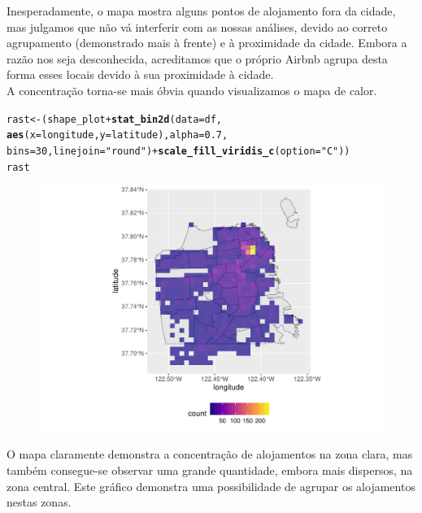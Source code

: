 \documentclass[justified, 11pt]{scrartcl}\usepackage[]{graphicx}\usepackage[]{xcolor}
\makeatletter
\def\maxwidth{ %
  \ifdim\Gin@nat@width>\linewidth
    \linewidth
  \else
    \Gin@nat@width
  \fi
}
\newcommand{\hlnum}[1]{\textcolor[rgb]{0.686,0.059,0.569}{#1}}%
\newcommand{\hlstr}[1]{\textcolor[rgb]{0.192,0.494,0.8}{#1}}%
\newcommand{\hlopt}[1]{\textcolor[rgb]{0,0,0}{#1}}%
\newcommand{\hlstd}[1]{\textcolor[rgb]{0.345,0.345,0.345}{#1}}%
\newcommand{\hlkwb}[1]{\textcolor[rgb]{0.69,0.353,0.396}{#1}}%
\newcommand{\hlkwc}[1]{\textcolor[rgb]{0.333,0.667,0.333}{#1}}%
\newcommand{\hlkwd}[1]{\textcolor[rgb]{0.737,0.353,0.396}{\textbf{#1}}}%
\newenvironment{kframe}{%
 \def\at@end@of@kframe{}%
 \ifinner\ifhmode%
  \def\at@end@of@kframe{\end{minipage}}%
  \begin{minipage}{\columnwidth}%
 \fi\fi%
 \def\FrameCommand##1{\hskip\@totalleftmargin \hskip-\fboxsep
 \colorbox{shadecolor}{##1}\hskip-\fboxsep
     \hskip-\linewidth \hskip-\@totalleftmargin \hskip\columnwidth}%
 \MakeFramed {\advance\hsize-\width
   \@totalleftmargin\z@ \linewidth\hsize
   \@setminipage}}%
 {\par\unskip\endMakeFramed%
 \at@end@of@kframe}
\newenvironment{knitrout}{}{} %
\makeatother
\begin{document}
Inesperadamente, o mapa mostra alguns pontos de alojamento fora da cidade, mas julgamos que não vá interferir com as nossas análises, devido ao correto agrupamento (demonstrado mais à frente) e à proximidade da cidade. Embora a razão nos seja desconhecida, acreditamos que o próprio Airbnb agrupa desta forma esses locais devido à sua proximidade à cidade. \\
A concentração torna-se mais óbvia quando visualizamos o mapa de calor.
\begin{knitrout}
\color{fgcolor}\begin{kframe}
\begin{alltt}
\hlstd{rast} \hlkwb{<-} \hlstd{(shape_plot} \hlopt{+} \hlkwd{stat_bin2d}\hlstd{(}\hlkwc{data} \hlstd{= df,}
  \hlkwd{aes}\hlstd{(}\hlkwc{x} \hlstd{= longitude,} \hlkwc{y} \hlstd{= latitude),} \hlkwc{alpha} \hlstd{=} \hlnum{0.7}\hlstd{,}
  \hlkwc{bins} \hlstd{=} \hlnum{30}\hlstd{,} \hlkwc{linejoin} \hlstd{=} \hlstr{"round"}\hlstd{)} \hlopt{+} \hlkwd{scale_fill_viridis_c}\hlstd{(}\hlkwc{option} \hlstd{=} \hlstr{"C"}\hlstd{))}
\hlstd{rast}
\end{alltt}
\end{kframe}\begin{figure}
\includegraphics[width=\maxwidth]{figure/chunk-rasterPlaces-1} \end{figure}

\end{knitrout}
O mapa claramente demonstra a concentração de alojamentos na zona clara, mas também consegue-se observar uma grande quantidade, embora mais dispersos, na zona central. Este gráfico demonstra uma possibilidade de agrupar os alojamentos nestas zonas.
\end{document}
